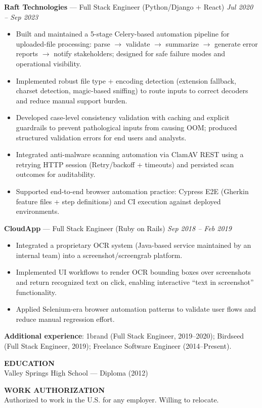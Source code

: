 \documentclass[10pt]{article}
\begin{document}
\textbf{Raft Technologies} --- Full Stack Engineer (Python/Django + React) \hfill \textit{Jul 2020 -- Sep 2023}\\
\vspace{-6pt}
\begin{itemize}
  \setlength\itemsep{-2pt}
  \setlength\parskip{0pt}
  \setlength\parsep{0pt}
  \item Built and maintained a 5-stage Celery-based automation pipeline for uploaded-file processing: parse $\rightarrow$ validate $\rightarrow$ summarize $\rightarrow$ generate error reports $\rightarrow$ notify stakeholders; designed for safe failure modes and operational visibility.
  \item Implemented robust file type + encoding detection (extension fallback, charset detection, magic-based sniffing) to route inputs to correct decoders and reduce manual support burden.
  \item Developed case-level consistency validation with caching and explicit guardrails to prevent pathological inputs from causing OOM; produced structured validation errors for end users and analysts.
  \item Integrated anti-malware scanning automation via ClamAV REST using a retrying HTTP session (Retry/backoff + timeouts) and persisted scan outcomes for auditability.
  \item Supported end-to-end browser automation practice: Cypress E2E (Gherkin feature files + step definitions) and CI execution against deployed environments.
\end{itemize}

\textbf{CloudApp} --- Full Stack Engineer (Ruby on Rails) \hfill \textit{Sep 2018 -- Feb 2019}\\
\vspace{-6pt}
\begin{itemize}
  \setlength\itemsep{-2pt}
  \setlength\parskip{0pt}
  \setlength\parsep{0pt}
  \item Integrated a proprietary OCR system (Java-based service maintained by an internal team) into a screenshot/screengrab platform.
  \item Implemented UI workflows to render OCR bounding boxes over screenshots and return recognized text on click, enabling interactive ``text in screenshot'' functionality.
  \item Applied Selenium-era browser automation patterns to validate user flows and reduce manual regression effort.
\end{itemize}

\textbf{Additional experience}: 1brand (Full Stack Engineer, 2019--2020); Birdseed (Full Stack Engineer, 2019); Freelance Software Engineer (2014--Present).

\vspace{6pt}
\textbf{EDUCATION}\\
Valley Springs High School --- Diploma (2012)

\vspace{2pt}
\textbf{WORK AUTHORIZATION}\\
Authorized to work in the U.S. for any employer. Willing to relocate.
\end{document}
